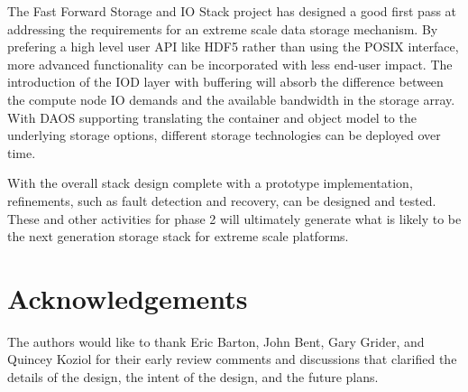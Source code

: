 \documentclass[conference]{IEEEtran}
\begin{document}
The Fast Forward Storage and IO Stack project has designed a good first pass at
addressing the requirements for an extreme scale data storage mechanism.  By
prefering a high level user API like HDF5 rather than using the POSIX
interface, more advanced functionality can be incorporated with less end-user
impact. The introduction of the IOD layer with buffering will absorb the
difference between the compute node IO demands and the available bandwidth in
the storage array. With DAOS supporting translating the container and object
model to the underlying storage options, different storage technologies can be
deployed over time.

With the overall stack design complete with a prototype implementation,
refinements, such as fault detection and recovery, can be designed and tested.
These and other activities for phase 2 will ultimately generate what is likely
to be the next generation storage stack for extreme scale platforms.

\section{Acknowledgements}
The authors would like to thank Eric Barton, John Bent, Gary Grider, and
Quincey Koziol for their early review comments and discussions that clarified
the details of the design, the intent of the design, and the future plans.
\end{document}
